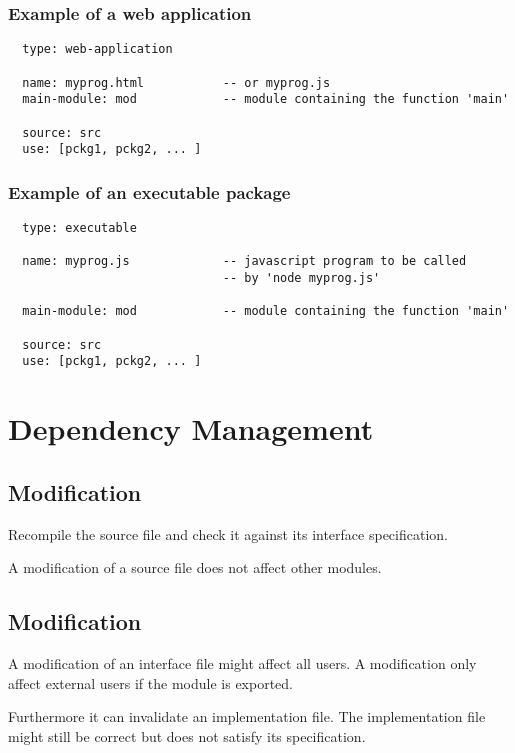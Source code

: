 \subsubsection{ Example of a web application}
{\small
\begin{verbatim}
  type: web-application

  name: myprog.html           -- or myprog.js
  main-module: mod            -- module containing the function 'main'

  source: src
  use: [pckg1, pckg2, ... ]
\end{verbatim}
}


\subsubsection{ Example of an executable package}
{\small
\begin{verbatim}
  type: executable

  name: myprog.js             -- javascript program to be called
                              -- by 'node myprog.js'

  main-module: mod            -- module containing the function 'main'

  source: src
  use: [pckg1, pckg2, ... ]
\end{verbatim}
}



\section{Dependency Management}

\subsection{ Modification}

Recompile the source file and check it against its interface specification.

A modification of a source file does not affect other modules.


\subsection{ Modification}

A modification of an interface file might affect all users. A modification
only affect external users if the module is exported.

Furthermore it can invalidate an implementation file. The implementation file
might still be correct but does not satisfy its specification.

